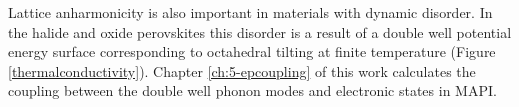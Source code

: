 
Lattice anharmonicity is also important in materials with dynamic disorder. In the halide and oxide perovskites this disorder is a result of a double well potential energy surface corresponding to octahedral tilting at finite temperature (Figure \ref{thermalconductivity}).%
Chapter \ref{ch:5-epcoupling} of this work calculates the coupling between the double well phonon modes and electronic states in MAPI.





